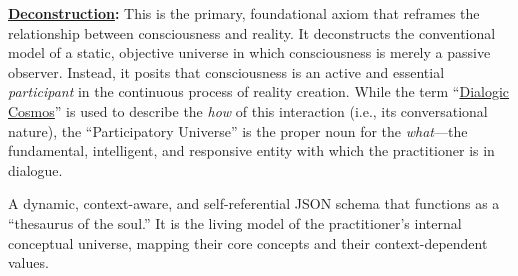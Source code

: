     \begin{nobullet}
        \item \textbf{\hyperlink{gloss:deconstruction}{Deconstruction}:} This is the primary, foundational axiom that reframes the relationship between consciousness and reality. It deconstructs the conventional model of a static, objective universe in which consciousness is merely a passive observer. Instead, it posits that consciousness is an active and essential \textit{participant} in the continuous process of reality creation. While the term ``\hyperlink{gloss:dialogic_cosmos}{Dialogic Cosmos}'' is used to describe the \textit{how} of this interaction (i.e., its conversational nature), the ``Participatory Universe'' is the proper noun for the \textit{what}—the fundamental, intelligent, and responsive entity with which the practitioner is in dialogue.
    \end{nobullet}

\item[\hypertarget{gloss:pikb}{Personal Idiolect Knowledge Base}] 
    A dynamic, context-aware, and self-referential JSON schema that functions as a ``thesaurus of the soul.'' It is the living model of the practitioner's internal conceptual universe, mapping their core concepts and their context-dependent values.

